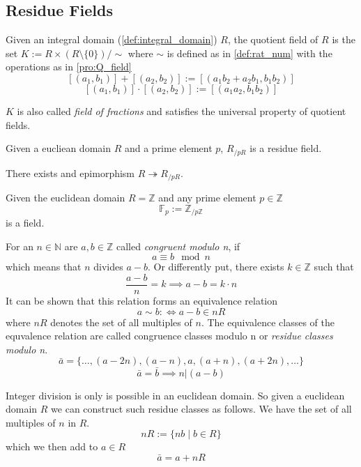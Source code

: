\subsection{Residue Fields}
\begin{definition}
   Given an integral domain (\ref{def:integral_domain}) \(R\), the quotient field of \(R\) is the set \(K := R \times (R \setminus \{0\})/\sim\) where \(\sim\) is defined as in \cref{def:rat_num}
   with the operations as in \cref{pro:Q_field}
   \[[(a_1, b_1)] + [(a_2, b_2)] := [(a_1b_2 + a_2b_1, b_1b_2)]\]
   \[[(a_1, b_1)] \cdot [(a_2, b_2)] := [(a_1a_2, b_1b_2)]\]
\end{definition}
\begin{remark}
   \(K\) is also called \emph{field of fractions} and satisfies the universal property of quotient fields.
\end{remark}

\begin{definition}
   Given a eucliean domain \(R\) and a prime element \(p\), \(R_{/pR}\) is a residue field.
\end{definition}
\begin{remark}
   There exists and epimorphism \(R \twoheadrightarrow R_{/pR}\).
\end{remark}

\begin{definition}
   Given the euclidean domain \(R = \mathbb{Z}\) and any prime element \(p \in \mathbb{Z}\)
   \[\mathbb{F}_p := \mathbb{Z}_{/p\mathbb{Z}}\]
   is a field.
\end{definition}

For an \(n \in \mathbb{N}\) are \(a, b \in \mathbb{Z}\) called \textit{congruent modulo n}, if
\[a \equiv b \mod n\]
which means that \(n\) divides \(a - b\).
Or differently put, there exists \(k \in \mathbb{Z}\) such that
\[\frac{a - b}{n} = k \implies a - b = k \cdot n\]
It can be shown that this relation forms an equivalence relation
\[a \sim b :\iff a - b \in nR\]
where \(nR\) denotes the set of all multiples of \(n\).
The equivalence classes of the equvalence relation are called congruence classes modulo n or \textit{residue classes modulo n}.
\[\bar{a} = \{\ldots, (a-2n), (a-n), a, (a+n), (a+2n), \ldots\}\]
\[\bar{a} = \bar{b} \implies n | (a - b)\]

Integer division is only is possible in an euclidean domain.
So given a euclidean domain \(R\) we can construct such residue classes as follows.
We have the set of all multiples of \(n\) in \(R\).
\[nR := \{nb \mid b \in R\}\]
which we then add to \(a \in R\)
\[\bar{a} = a + nR\]

